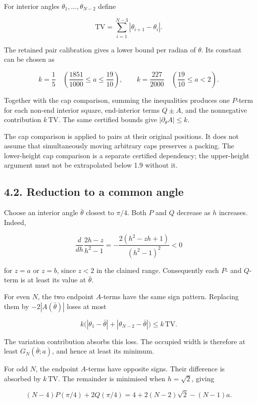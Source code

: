 \documentclass[
  11pt,
  a4paper,
]{article}
\begin{document}
For interior angles \(\theta_1,\ldots,\theta_{N-2}\) define

\[
\mathrm{TV}=\sum_{i=1}^{N-3}|\theta_{i+1}-\theta_i|.
\]

The retained pair calibration gives a lower bound per radian of
\(\theta\). Its constant can be chosen as

\[
k=\frac15\quad\left(\frac{1851}{1000}\le a\le\frac{19}{10}\right),
\qquad
k=\frac{227}{2000}\quad\left(\frac{19}{10}\le a<2\right).
\]

Together with the cap comparison, summing the inequalities produces one
\(P\)-term for each non-end interior square, end-interior terms
\(Q\pm A\), and the nonnegative contribution \(k\,\mathrm{TV}\). The
same certified bounds give \(|\partial_\theta A|\le k\).

The cap comparison is applied to pairs at their original positions. It
does not assume that simultaneously moving arbitrary caps preserves a
packing. The lower-height cap comparison is a separate certified
dependency; the upper-height argument must not be extrapolated below 1.9
without it.

\subsection{4.2. Reduction to a common
angle}\label{reduction-to-a-common-angle}

Choose an interior angle \(\bar\theta\) closest to \(\pi/4\). Both \(P\)
and \(Q\) decrease as \(h\) increases. Indeed,

\[
\frac{d}{dh}\frac{2h-z}{h^2-1}
=-\frac{2(h^2-zh+1)}{(h^2-1)^2}<0
\]

for \(z=a\) or \(z=b\), since \(z<2\) in the claimed range. Consequently
each \(P\)- and \(Q\)-term is at least its value at \(\bar\theta\).

For even \(N\), the two endpoint \(A\)-terms have the same sign pattern.
Replacing them by \(-2|A(\bar\theta)|\) loses at most

\[
k\bigl(|\theta_1-\bar\theta|+|\theta_{N-2}-\bar\theta|\bigr)
\le k\,\mathrm{TV}.
\]

The variation contribution absorbs this loss. The occupied width is
therefore at least \(G_N(\bar\theta;a)\), and hence at least its
minimum.

For odd \(N\), the endpoint \(A\)-terms have opposite signs. Their
difference is absorbed by \(k\,\mathrm{TV}\). The remainder is minimised
when \(h=\sqrt2\), giving

\[
(N-4)P(\pi/4)+2Q(\pi/4)
=4+2(N-2)\sqrt2-(N-1)a.
\]
\end{document}
